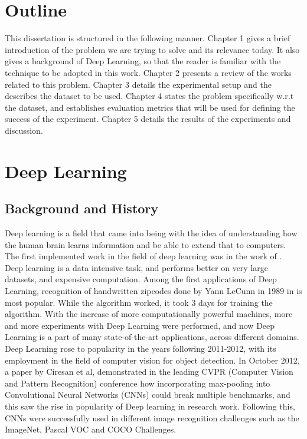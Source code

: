 \section{Outline}
This dissertation is structured in the following manner. Chapter 1 gives a brief introduction of the problem we are trying to solve and its relevance today. It also gives a background of Deep Learning, so that the reader is familiar with the technique to be adopted in this work. Chapter 2 presents a review of the works related to this problem. Chapter 3 details the experimental setup and the describes the dataset to be used. Chapter 4 states the problem specifically w.r.t the dataset, and establishes evaluation metrics that will be used for defining the success of the experiment. Chapter 5 details the results of the experiments and discussion.






\section{Deep Learning}
\subsection{Background and History}
Deep learning is a field that came into being with the idea of understanding how the human brain learns information and be able to extend that to computers.
The first implemented work in the field of deep learning was in the work of \citet{ivakhnenko_cybernetic_1973}.
Deep learning is a data intensive task, and performs better on very large datasets, and expensive computation. Among the first applications of Deep Learning, recognition of handwritten zipcodes done by Yann LeCunn in 1989 in \cite{lecun_backpropagation_1989} is most popular. While the algorithm worked, it took 3 days for training the algorithm.
With the increase of more computationally powerful machines, more and more experiments with Deep Learning were performed, and now Deep Learning is a part of many state-of-the-art applications, across different domains\cite{sak_fast_2015}\cite{deng_deep_2013}\cite{li_constructing_2014}. Deep Learning rose to popularity in the years following 2011-2012, with its employment in the field of computer vision for object detection. In October 2012, a paper by Ciresan et al, demonstrated in the leading CVPR (Computer Vision and Pattern Recognition) conference  how incorporating max-pooling into Convolutional Neural Networks (CNNs) could break multiple benchmarks, and this saw the rise in popularity of Deep learning in research work. Following this, CNNs were successfully used in different image recognition challenges such as the ImageNet\cite{deng_imagenet:_2009}, Pascal VOC\cite{everingham_pascal_2010} and COCO\cite{lin_microsoft_2014} Challenges.

